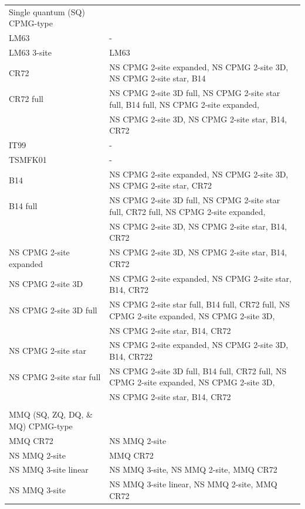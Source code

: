 \begin{center}
\begin{small}
\begin{longtable}{ll}
\\[-5pt]
Single quantum (SQ) CPMG-type \\
\cline{1-1}
LM63                             & - \\
LM63 3-site                      & LM63 \\
CR72                             & NS CPMG 2-site expanded, NS CPMG 2-site 3D, NS CPMG 2-site star, B14 \\
CR72 full                        & NS CPMG 2-site 3D full, NS CPMG 2-site star full, B14 full, NS CPMG 2-site expanded, \\
                                 & NS CPMG 2-site 3D, NS CPMG 2-site star, B14, CR72 \\
IT99                             & - \\
TSMFK01                          & - \\
B14                              & NS CPMG 2-site expanded, NS CPMG 2-site 3D, NS CPMG 2-site star, CR72 \\
B14 full                         & NS CPMG 2-site 3D full, NS CPMG 2-site star full, CR72 full, NS CPMG 2-site expanded, \\
                                 & NS CPMG 2-site 3D, NS CPMG 2-site star, B14, CR72 \\
NS CPMG 2-site expanded          & NS CPMG 2-site 3D, NS CPMG 2-site star, B14, CR72 \\
NS CPMG 2-site 3D                & NS CPMG 2-site expanded, NS CPMG 2-site star, B14, CR72 \\
NS CPMG 2-site 3D full           & NS CPMG 2-site star full, B14 full, CR72 full, NS CPMG 2-site expanded, NS CPMG 2-site 3D, \\
                                 & NS CPMG 2-site star, B14, CR72 \\
NS CPMG 2-site star              & NS CPMG 2-site expanded, NS CPMG 2-site 3D, B14, CR722 \\
NS CPMG 2-site star full         & NS CPMG 2-site 3D full, B14 full, CR72 full, NS CPMG 2-site expanded, NS CPMG 2-site 3D, \\
                                 & NS CPMG 2-site star, B14, CR72 \\

\\[-5pt]
MMQ (SQ, ZQ, DQ, \& MQ) CPMG-type \\
\cline{1-1}
MMQ CR72                         & NS MMQ 2-site \\
NS MMQ 2-site                    & MMQ CR72 \\
NS MMQ 3-site linear             & NS MMQ 3-site, NS MMQ 2-site, MMQ CR72 \\
NS MMQ 3-site                    & NS MMQ 3-site linear, NS MMQ 2-site, MMQ CR72 \\


\end{longtable}
\end{small}
\end{center}
